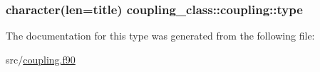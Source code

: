 \hypertarget{structcoupling__class_1_1coupling_a74b13fd447f07c24380e3913fd06d545}{
\subsubsection[{type}]{\setlength{\rightskip}{0pt plus 5cm}character(len=title) coupling\+\_\+class\+::coupling\+::type\hspace{0.3cm}{\ttfamily [private]}}}\label{structcoupling__class_1_1coupling_a74b13fd447f07c24380e3913fd06d545}


The documentation for this type was generated from the following file\+:\begin{DoxyCompactItemize}
\item 
src/\hyperlink{coupling_8f90}{coupling.\+f90}\end{DoxyCompactItemize}
